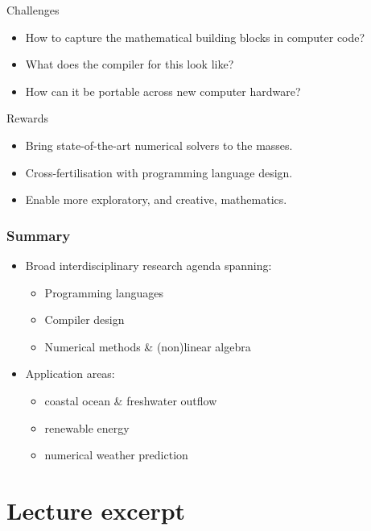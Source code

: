 \documentclass[presentation]{beamer}
\begin{document}
\begin{frame}
  \begin{block}{Challenges}
    \begin{itemize}
    \item How to capture the mathematical building blocks in computer
      code?
    \item What does the compiler for this look like?
    \item How can it be portable across new computer hardware?
    \end{itemize}
  \end{block}
  \begin{block}{Rewards}
    \begin{itemize}
    \item Bring state-of-the-art numerical solvers to the masses.
    \item Cross-fertilisation with programming language design.
    \item Enable more exploratory, and creative, mathematics.
    \end{itemize}
  \end{block}
\end{frame}


\begin{frame}
  \frametitle{Summary}
  \begin{itemize}
  \item Broad interdisciplinary research agenda spanning:
    \begin{itemize}
    \item Programming languages
    \item Compiler design
    \item Numerical methods \& (non)linear algebra
    \end{itemize}
  \item Application areas:
    \begin{itemize}
    \item coastal ocean \& freshwater outflow
    \item renewable energy
    \item numerical weather prediction
    \end{itemize}
  \end{itemize}
\end{frame}


\section{Lecture excerpt}
\end{document}
